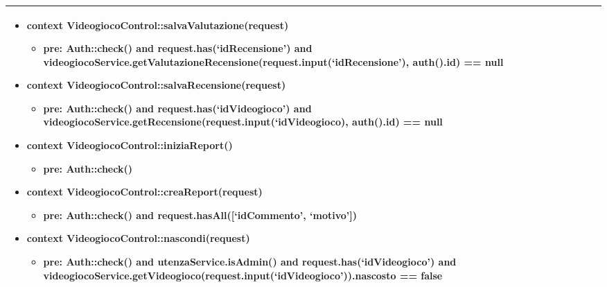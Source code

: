 \begin{tabular}{|| l | p{28.5em} ||}
\begin{itemize}[leftmargin=*]
	\item \textbf{context} VideogiocoControl::salvaValutazione(request)
	\begin{itemize}
		\item[ ] \textbf{pre:} Auth::check() and request.has(‘idRecensione’) and videogiocoService.getValutazioneRecensione(request.input(‘idRecensione’), auth().id) == null
	\end{itemize}

	\item \textbf{context} VideogiocoControl::salvaRecensione(request)
	\begin{itemize}
		\item[ ] \textbf{pre:} Auth::check() and request.has(‘idVideogioco’) and videogiocoService.getRecensione(request.input(‘idVideogioco), auth().id) == null
	\end{itemize}

	\item \textbf{context} VideogiocoControl::iniziaReport()
	\begin{itemize}
		\item[ ] \textbf{pre:} Auth::check()
	\end{itemize}

	\item \textbf{context} VideogiocoControl::creaReport(request)
	\begin{itemize}
		\item[ ] \textbf{pre:} Auth::check()
		and request.hasAll([‘idCommento’, ‘motivo’])	
	\end{itemize}

	\item \textbf{context} VideogiocoControl::nascondi(request)
	\begin{itemize}
		\item[ ] \textbf{pre:} Auth::check() and utenzaService.isAdmin() and request.has(‘idVideogioco’) and videogiocoService.getVideogioco(request.input(‘idVideogioco’)).nascosto == false	
	\end{itemize}
\end{itemize}\\
\hline
\end{tabular}

\newpage
